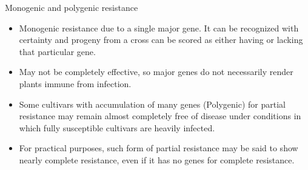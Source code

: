 \documentclass[11pt,dvipsnames,ignorenonframetext,aspectratio=169]{beamer}
\providecommand{\tightlist}{%
  \setlength{\itemsep}{0pt}\setlength{\parskip}{0pt}}
\begin{document}
\begin{frame}{Monogenic and polygenic resistance}
\protect\hypertarget{monogenic-and-polygenic-resistance}{}
\small

\begin{itemize}
\tightlist
\item
  \alert{Monogenic} resistance due to a single major gene. It can be
  recognized with certainty and progeny from a cross can be scored as
  either having or lacking that particular gene.
\item
  May not be completely effective, so major genes do not necessarily
  render plants immune from infection.
\item
  Some cultivars with accumulation of many genes (\alert{Polygenic}) for
  partial resistance may remain almost completely free of disease under
  conditions in which fully susceptible cultivars are heavily infected.
\item
  For practical purposes, such form of partial resistance may be said to
  show nearly complete resistance, even if it has no genes for complete
  resistance.
\end{itemize}
\end{frame}
\end{document}

